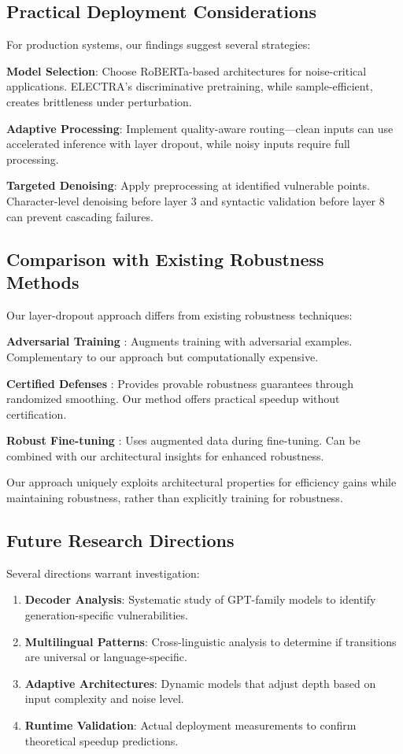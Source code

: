 \subsection{Practical Deployment Considerations}

For production systems, our findings suggest several strategies:

\textbf{Model Selection}: Choose RoBERTa-based architectures for noise-critical applications. ELECTRA's discriminative pretraining, while sample-efficient, creates brittleness under perturbation.

\textbf{Adaptive Processing}: Implement quality-aware routing—clean inputs can use accelerated inference with layer dropout, while noisy inputs require full processing.

\textbf{Targeted Denoising}: Apply preprocessing at identified vulnerable points. Character-level denoising before layer 3 and syntactic validation before layer 8 can prevent cascading failures.

\subsection{Comparison with Existing Robustness Methods}

Our layer-dropout approach differs from existing robustness techniques:

\textbf{Adversarial Training} \cite{madry2018towards}: Augments training with adversarial examples. Complementary to our approach but computationally expensive.

\textbf{Certified Defenses} \cite{cohen2019certified}: Provides provable robustness guarantees through randomized smoothing. Our method offers practical speedup without certification.

\textbf{Robust Fine-tuning} \cite{hendrycks2020augmax}: Uses augmented data during fine-tuning. Can be combined with our architectural insights for enhanced robustness.

Our approach uniquely exploits architectural properties for efficiency gains while maintaining robustness, rather than explicitly training for robustness.

\subsection{Future Research Directions}

Several directions warrant investigation:

\begin{enumerate}
\item \textbf{Decoder Analysis}: Systematic study of GPT-family models to identify generation-specific vulnerabilities.
\item \textbf{Multilingual Patterns}: Cross-linguistic analysis to determine if transitions are universal or language-specific.
\item \textbf{Adaptive Architectures}: Dynamic models that adjust depth based on input complexity and noise level.
\item \textbf{Runtime Validation}: Actual deployment measurements to confirm theoretical speedup predictions.
\end{enumerate}